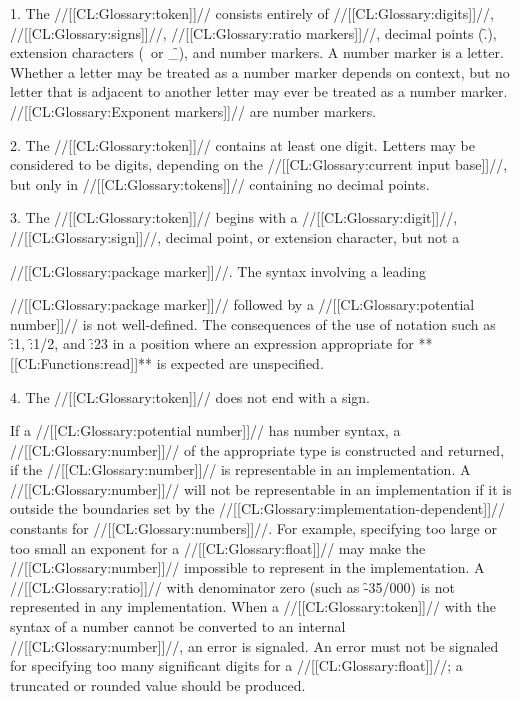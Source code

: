 \beginlist
\item{1.}
The //[[CL:Glossary:token]]// consists entirely of 
  //[[CL:Glossary:digits]]//,
  //[[CL:Glossary:signs]]//,
  //[[CL:Glossary:ratio markers]]//,
  decimal points (\f{.}),
  extension characters (\hat\ or \f{\_}),
  and number markers.
A number marker is a letter. 
Whether a letter may be treated as a number marker depends on context,
but no letter that is adjacent to another letter may ever be treated as a number marker.
//[[CL:Glossary:Exponent markers]]// are number markers.


\item{2.}
The //[[CL:Glossary:token]]// contains at least one digit.  Letters may be considered to be
digits, depending on the //[[CL:Glossary:current input base]]//, but only
in //[[CL:Glossary:tokens]]// containing no decimal points.



\item{3.}
The //[[CL:Glossary:token]]// begins with a //[[CL:Glossary:digit]]//, //[[CL:Glossary:sign]]//, decimal point, or extension character,
but not a 

//[[CL:Glossary:package marker]]//.
The syntax involving a leading 

//[[CL:Glossary:package marker]]// followed by a //[[CL:Glossary:potential number]]// is
not well-defined. The consequences of the use 
of notation such as \f{:1}, \f{:1/2}, and \f{:2{\hat}3} in a
position where an expression appropriate for **[[CL:Functions:read]]** 
is expected are unspecified.



\item{4.}
The //[[CL:Glossary:token]]// does not end with a sign.
\endlist


If a //[[CL:Glossary:potential number]]// has number syntax, 
a //[[CL:Glossary:number]]// of the appropriate type is constructed and returned, 
if the //[[CL:Glossary:number]]// is representable in an implementation.
A //[[CL:Glossary:number]]// will not be representable in an implementation 
if it is outside the boundaries set by the //[[CL:Glossary:implementation-dependent]]// 
constants for //[[CL:Glossary:numbers]]//.
For example, specifying too large or too small an exponent for a //[[CL:Glossary:float]]//
may make the //[[CL:Glossary:number]]// impossible to represent in the implementation.
A //[[CL:Glossary:ratio]]// with denominator zero (such as \f{-35/000})
is not represented in any implementation.
When a //[[CL:Glossary:token]]// with the syntax of a number cannot be converted to an internal
//[[CL:Glossary:number]]//, an error  is signaled.  An error
must not be signaled for specifying too many significant digits
for a //[[CL:Glossary:float]]//; a truncated or rounded value should be produced.



